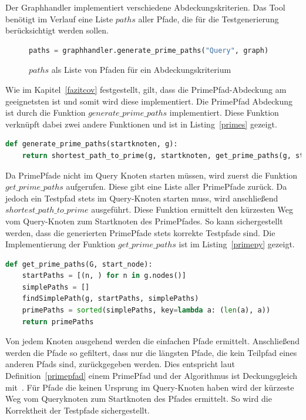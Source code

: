 Der Graphhandler implementiert verschiedene Abdeckungskriterien.
Das Tool benötigt im Verlauf eine Liste $paths$ aller Pfade, die für die Testgenerierung berücksichtigt werden sollen.

\begin{figure}[H]
    \begin{lstlisting}[language=Python]
paths = graphhandler.generate_prime_paths("Query", graph)
    \end{lstlisting}
    \caption{$paths$ als Liste von Pfaden für ein Abdeckungskriterium}
\end{figure}

Wie im Kapitel~\ref{fazitcov} festgestellt, gilt, dass die PrimePfad-Abdeckung am geeignetsten ist und somit wird diese implementiert.
Die PrimePfad Abdeckung ist durch die Funktion $generate\_prime\_paths$ implementiert.
Diese Funktion verknüpft dabei zwei andere Funktionen und ist in Listing~\ref{primes} gezeigt.

\begin{lstlisting}[language=Python,caption={valide PrimePfad Generierung}, label={primes}]
def generate_prime_paths(startknoten, g):
    return shortest_path_to_prime(g, startknoten, get_prime_paths(g, startknoten))
\end{lstlisting}

Da PrimePfade nicht im Query Knoten starten müssen, wird zuerst die Funktion $get\_prime\_paths$ aufgerufen.
Diese gibt eine Liste aller PrimePfade zurück.
Da jedoch ein Testpfad stets im Query-Knoten starten muss, wird anschließend $shortest\_path\_to\_prime$ ausgeführt.
Diese Funktion ermittelt den kürzesten Weg vom Query-Knoten zum Startknoten des PrimePfades.
So kann sichergestellt werden, dass die generierten PrimePfade stets korrekte Testpfade sind.
Die Implementierung der Funktion $get\_prime\_paths$ ist im Listing~\ref{primepy} gezeigt.

\begin{lstlisting}[language=Python, caption={PrimePfad Algorithmus}, label={primepy}]
def get_prime_paths(G, start_node):
    startPaths = [(n, ) for n in g.nodes()]
    simplePaths = []
    findSimplePath(g, startPaths, simplePaths)
    primePaths = sorted(simplePaths, key=lambda a: (len(a), a))
    return primePaths
\end{lstlisting}

Von jedem Knoten ausgehend werden die einfachen Pfade ermittelt.
Anschließend werden die Pfade so gefiltert, dass nur die längsten Pfade, die kein Teilpfad eines anderen Pfads sind, zurückgegeben werden.
Dies entspricht laut Definition~\ref{primepfad} einem PrimePfad und der Algorithmus ist Deckungsgleich mit~\cite[Finding Prime Test Paths S. 39]{software-testing}.
Für Pfade die keinen Ursprung im Query-Knoten haben wird der kürzeste Weg vom Queryknoten zum Startknoten des Pfades ermittelt.
So wird die Korrektheit der Testpfade sichergestellt.

